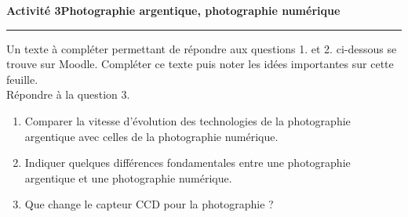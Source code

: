 \documentclass[a4paper]{article}
\begin{document}
%
%
%
%
%
%

\noindent\textbf{Activité 3}\hfill{}\textbf{Photographie argentique, photographie numérique}
\smallskip
\hrule
\medskip

Un texte à compléter permettant de répondre aux questions 1. et 2. ci-dessous se trouve sur Moodle. Compléter ce texte puis noter les idées importantes sur cette feuille.\\
Répondre à la question 3.

\begin{enumerate}
  \item Comparer la vitesse d'évolution des technologies de la photographie argentique avec celles de la photographie numérique.
  \item Indiquer quelques différences fondamentales entre une photographie argentique et une photographie numérique.
  \item Que change le capteur CCD pour la photographie ?
\end{enumerate}
\end{document}
